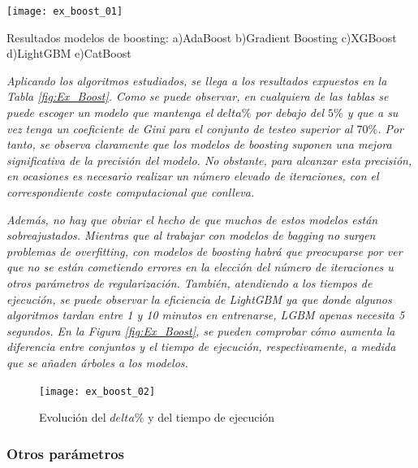 \documentclass[12pt,twoside]{article}
\begin{document}
\begin{table}[h]
\centering
\texttt{[image: ex\_boost\_01]}
\caption{Resultados modelos de boosting: a)AdaBoost b)Gradient Boosting c)XGBoost d)LightGBM e)CatBoost}
\label{fig:Ex_Boost}
\end{table}

\emph{Aplicando los algoritmos estudiados, se llega a los resultados expuestos en la Tabla \ref{fig:Ex_Boost}. Como se puede observar, en cualquiera de las tablas se puede escoger un modelo que mantenga el $delta\%$ por debajo del $5\%$ y que a su vez tenga un coeficiente de Gini para el conjunto de testeo superior al $70\%$. Por tanto, se observa claramente que los modelos de boosting suponen una mejora significativa de la precisión del modelo. No obstante, para alcanzar esta precisión, en ocasiones es necesario realizar un número elevado de iteraciones, con el correspondiente coste computacional que conlleva.}


\emph{Además, no hay que obviar el hecho de que muchos de estos modelos están sobreajustados. Mientras que al trabajar con modelos de bagging no surgen problemas de overfitting, con modelos de boosting habrá que preocuparse por ver que no se están cometiendo errores en la elección del número de iteraciones u otros parámetros de regularización. También, atendiendo a los tiempos de ejecución, se puede observar la eficiencia de LightGBM ya que donde algunos algoritmos tardan entre 1 y 10 minutos en entrenarse, LGBM apenas necesita 5 segundos. En la Figura \ref{fig:Ex_Boost}, se pueden comprobar cómo aumenta la diferencia entre conjuntos y el tiempo de ejecución, respectivamente, a medida que se añaden árboles a los modelos.}

\begin{figure}[h]
\centering
\texttt{[image: ex\_boost\_02]}
\caption{Evolución del $delta\%$ y del tiempo de ejecución}
\end{figure}





\subsubsection{Otros parámetros}
\end{document}
